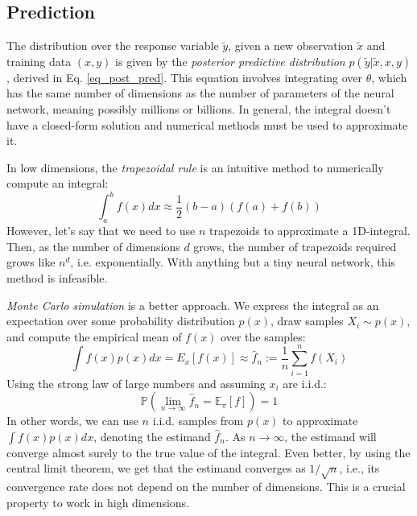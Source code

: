 \documentclass[12pt]{article}
\begin{document}
\subsection{Prediction}
\label{sec_prediction}

The distribution over the response variable $\tilde{y}$, given a new observation $\tilde{x}$ and training data $(x, y)$ is given by the \textit{posterior predictive distribution} $p(\tilde{y} | \tilde{x}, x, y)$, derived in Eq. \ref{eq_post_pred}. This equation involves integrating over $\theta$, which has the same number of dimensions as the number of parameters of the neural network, meaning possibly millions or billions. In general, the integral doesn't have a closed-form solution and numerical methods must be used to approximate it.

In low dimensions, the \textit{trapezoidal rule} is an intuitive method to numerically compute an integral:
\begin{equation}
\int_{a}^{b} f(x) d x \approx \frac{1}{2}(b-a)(f(a)+f(b))
\end{equation}
However, let's say that we need to use $n$ trapezoids to approximate a 1D-integral. Then, as the number of dimensions $d$ grows, the number of trapezoids required grows like $n^d$, i.e. exponentially. With anything but a tiny neural network, this method is infeasible.

\textit{Monte Carlo simulation} is a better approach. We express the integral as an expectation over some probability distribution $p(x)$, draw samples $X_i \sim p(x)$, and compute the empirical mean of $f(x)$ over the samples:
\begin{equation}
\int f(x)p(x) dx = E_x[f(x)] \approx \hat{f}_n := \frac{1}{n} \sum_{i=1}^n f(X_i)
\end{equation}
Using the strong law of large numbers and assuming $x_i$ are i.i.d.:
\begin{equation}
\mathbb{P}\left(\lim_{n \rightarrow \infty} \hat{f}_n = \mathbb{E}_{\pi}[f]\right)=1
\end{equation}
In other words, we can use $n$ i.i.d. samples from $p(x)$ to approximate $\int f(x)p(x) dx$, denoting the estimand $\hat{f}_n$. As $n \rightarrow \infty$, the estimand will converge almost surely to the true value of the integral. Even better, by using the central limit theorem, we get that the estimand converges as $1/\sqrt n$, i.e., its convergence rate does not depend on the number of dimensions. This is a crucial property to work in high dimensions.
\end{document}
